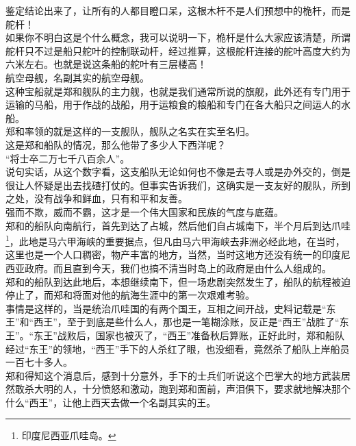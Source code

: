 \begin{multicols}{\theparacolNo}
鉴定结论出来了，让所有的人都目瞪口呆，这根木杆不是人们预想中的桅杆，而是舵杆！\\

如果你不明白这是个什么概念，我可以说明一下，桅杆是什么大家应该清楚，所谓舵杆只不过是船只舵叶的控制联动杆，经过推算，这根舵杆连接的舵叶高度大约为六米左右。也就是说这条船的舵叶有三层楼高！\\

航空母舰，名副其实的航空母舰。\\

这种宝船就是郑和舰队的主力舰，也就是我们通常所说的旗舰，此外还有专门用于运输的马船，用于作战的战船，用于运粮食的粮船和专门在各大船只之间运人的水船。\\

郑和率领的就是这样的一支舰队，舰队之名实在实至名归。\\

这是郑和船队的情况，那么他带了多少人下西洋呢？\\

“将士卒二万七千八百余人”。\\

说句实话，从这个数字看，这支船队无论如何也不像是去寻人或是办外交的，倒是很让人怀疑是出去找碴打仗的。但事实告诉我们，这确实是一支友好的舰队，所到之处，没有战争和鲜血，只有和平和友善。\\

强而不欺，威而不霸，这才是一个伟大国家和民族的气度与底蕴。\\

郑和的船队向南航行，首先到达了占城，然后他们自占城南下，半个月后到达爪哇\footnote{印度尼西亚爪哇岛。}，此地是马六甲海峡的重要据点，但凡由马六甲海峡去非洲必经此地，在当时，这里也是一个人口稠密，物产丰富的地方，当然，当时这地方还没有统一的印度尼西亚政府。而且直到今天，我们也搞不清当时岛上的政府是由什么人组成的。\\

郑和的船队到达此地后，本想继续南下，但一场悲剧突然发生了，船队的航程被迫停止了，而郑和将面对他的航海生涯中的第一次艰难考验。\\

事情是这样的，当是统治爪哇国的有两个国王，互相之间开战，史料记载是“东王”和“西王”，至于到底是些什么人，那也是一笔糊涂账，反正是“西王”战胜了“东王”。“东王”战败后，国家也被灭了，“西王”准备秋后算账，正好此时，郑和船队经过“东王”的领地，“西王”手下的人杀红了眼，也没细看，竟然杀了船队上岸船员一百七十多人。\\

郑和得知这个消息后，感到十分意外，手下的士兵们听说这个巴掌大的地方武装居然敢杀大明的人，十分愤怒和激动，跑到郑和面前，声泪俱下，要求就地解决那个什么“西王”，让他上西天去做一个名副其实的王。\\


\end{multicols}
